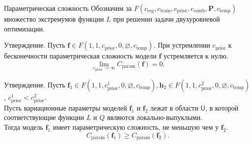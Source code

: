 \documentclass[usenames,dvipsnames,10pt,pdf,utf8,russian,aspectratio=43]{beamer}
\begin{document}
\begin{frame}{Параметрическая сложность}
\small
Обозначим за $F(c_{\text{reg}}, c_{\text{train}}, c_{\text{prior}}, c_{\text{comb}}, \mathbf{P}, c_{\text{temp}})$ множество экстремумов функции $L$ при решении задачи двухуровневой оптимизации.
\begin{block}{Утверждение.}
Пусть $\mathbf{f} \in F(1, 1, c_{\text{prior}}, 0, \varnothing,  c_{\text{temp}} )$.
При устремлении $ c_{\text{prior}}$ к бесконечности параметрическая сложность модели $\mathbf{f}$ устремляется к нулю.
\[
    \lim_{c_{\text{prior}} \to \infty} C_{\text{param}}(\mathbf{f}) = 0.
\]
\end{block}

\begin{block}{Утверждение.}
Пусть $\mathbf{f}_1 \in F(1, 1, c_{\text{prior}}^1, 0, \varnothing,  c_{\text{temp}} ), \mathbf{h}_2 \in F(1, 1, c_{\text{prior}}^2, 0, \varnothing,  c_{\text{temp}})$, $c_{\text{prior}}^1 < c_{\text{prior}}^2$.\\
Пусть вариационные параметры моделей $\mathbf{f}_1$ и $\mathbf{f}_2$ лежат в области $\mathsf{U}$, в которой соответствующие функции $L$ и $Q$ являются локально-выпуклыми.\\ 
Тогда модель $\mathbf{f}_1$ имеет параметрическую сложность, не меньшую чем у $\mathbf{f}_2$.
\[
    C_\text{param}(\mathbf{f}_1) \geq C_\text{param}(\mathbf{f}_2).
\]
\end{block}


\end{frame}
\end{document}

